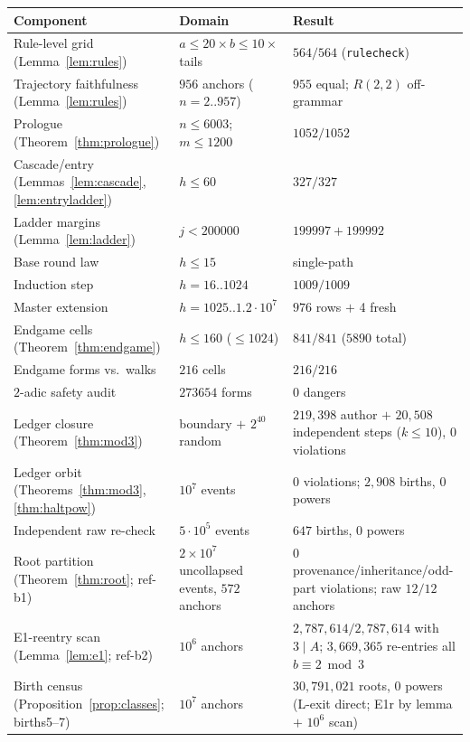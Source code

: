 \documentclass[11pt]{amsart}
\theoremstyle{definition}
\begin{document}
\begin{center}\small
\begin{tabular}{@{}p{5.0cm}p{3.9cm}p{6.6cm}@{}}
\toprule
Component & Domain & Result\\
\midrule
Rule-level grid (Lemma~\ref{lem:rules}) & $a\le20\times b\le10\times$ tails & $564/564$ (\texttt{rulecheck})\\
Trajectory faithfulness (Lemma~\ref{lem:rules}) & $956$ anchors ($n{=}2..957$) & $955$ equal; $R(2,2)$ off-grammar\\
Prologue (Theorem~\ref{thm:prologue}) & $n\le6003$; $m\le1200$ & $1052/1052$\\
Cascade/entry (Lemmas~\ref{lem:cascade},\ref{lem:entryladder}) & $h\le60$ & $327/327$\\
Ladder margins (Lemma~\ref{lem:ladder}) & $j<200000$ & $199997{+}199992$\\
Base round law & $h\le15$ & single-path\\
Induction step & $h=16..1024$ & $1009/1009$\\
Master extension & $h=1025..1.2\cdot10^{7}$ & $976$ rows $+$ 4 fresh\\
Endgame cells (Theorem~\ref{thm:endgame}) & $h\le160$ ($\le1024$) & $841/841$ ($5890$ total)\\
Endgame forms vs.\ walks & $216$ cells & $216/216$\\
$2$-adic safety audit & $273654$ forms & $0$ dangers\\
Ledger closure (Theorem~\ref{thm:mod3}) & boundary $+$ $2^{40}$ random & $219{,}398$ author $+$ $20{,}508$ independent steps ($k\le10$), $0$ violations\\
Ledger orbit (Theorems~\ref{thm:mod3}, \ref{thm:haltpow}) & $10^{7}$ events & $0$ violations; $2{,}908$ births, $0$ powers\\
Independent raw re-check & $5\cdot10^{5}$ events & $647$ births, $0$ powers\\
Root partition (Theorem~\ref{thm:root}; ref-b1) & $2\times10^{7}$ uncollapsed events, $572$ anchors & $0$ provenance/inheritance/odd-part violations; raw $12/12$ anchors\\
E1-reentry scan (Lemma~\ref{lem:e1}; ref-b2) & $10^{6}$ anchors & $2{,}787{,}614/2{,}787{,}614$ with $3\mid A$; $3{,}669{,}365$ re-entries all $b\equiv2\bmod3$\\
Birth census (Proposition~\ref{prop:classes}; births5--7) & $10^{7}$ anchors & $30{,}791{,}021$ roots, $0$ powers (L-exit direct; E1r by lemma $+$ $10^{6}$ scan)\\

\end{tabular}
\end{center}
\end{document}
